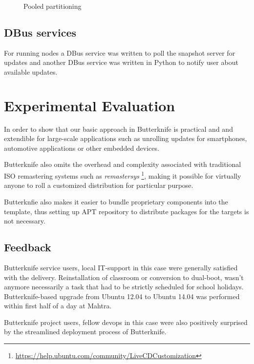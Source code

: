 \documentclass[a4paper,11pt]{kth-mag}
\begin{document}
\begin{figure}[!htb]
\centering
\scalebox{0.5}{}
\caption{Pooled partitioning}
\label{fig:pooled-partitioning}
\end{figure}


\section{DBus services}

For running nodes a DBus service was written to poll the snapshot server
for updates and another DBus service was written in Python to notify user
about available updates.



%
%
%
%
\chapter{Experimental Evaluation}
\label{chap:eval}
In order to show that our basic approach in Butterknife is practical and
and extendible for large-scale applications such as unrolling
updates for smartphones, automotive applications or other embedded devices.

Butterknife also omits the overhead
and complexity associated with traditional
ISO remastering systems such as \emph{remastersys}
\footnote{\url{https://help.ubuntu.com/community/LiveCDCustomization}},
making it possible for virtually anyone
to roll a customized distribution
for particular purpose.

Butterknfie also makes it easier to
bundle proprietary components
into the template, thus setting up APT repository to distribute
packages for the targets is not necessary.

\clearpage

\section{Feedback}

Butterknife service users, local IT-support in this case
were generally satisfied with the delivery.
Reinstallation of classroom or conversion to dual-boot,
wasn't anymore necessarily a task that had to
be strictly scheduled for school holidays.
Butterknife-based upgrade from Ubuntu 12.04 to
Ubuntu 14.04 was performed within first
half of a day at Mahtra.

Butterknife project users, fellow devops in this case
were also positively surprised by the
streamlined deployment process of Butterknife.
\end{document}
